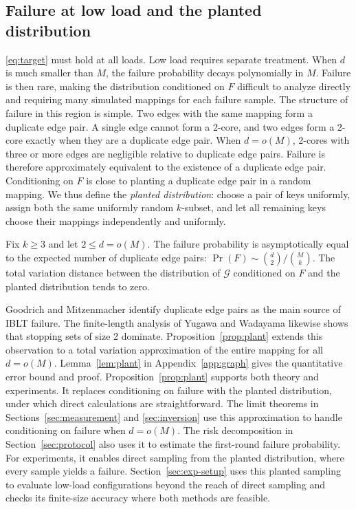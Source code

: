 \subsection{Failure at low load and the planted distribution}\label{sec:plant}
\eqref{eq:target} must hold at all loads. Low load requires separate treatment. When $d$ is much smaller than $M$, the failure probability decays polynomially in $M$. Failure is then rare, making the distribution conditioned on $F$ difficult to analyze directly and requiring many simulated mappings for each failure sample. The structure of failure in this region is simple. Two edges with the same mapping form a duplicate edge pair. A single edge cannot form a 2-core, and two edges form a 2-core exactly when they are a duplicate edge pair. When $d=o(M)$, 2-cores with three or more edges are negligible relative to duplicate edge pairs. Failure is therefore approximately equivalent to the existence of a duplicate edge pair. Conditioning on $F$ is close to planting a duplicate edge pair in a random mapping. We thus define the \emph{planted distribution}: choose a pair of keys uniformly, assign both the same uniformly random $k$-subset, and let all remaining keys choose their mappings independently and uniformly.

\begin{proposition}[Failure is determined by duplicate edge pairs when $d=o(M)$]\label{prop:plant}
Fix $k\ge3$ and let $2\le d=o(M)$. The failure probability is asymptotically equal to the expected number of duplicate edge pairs: $\Pr(F)\sim\binom d2/\binom Mk$. The total variation distance between the distribution of $\mathcal G$ conditioned on $F$ and the planted distribution tends to zero.
\end{proposition}

Goodrich and Mitzenmacher\cite{gm} identify duplicate edge pairs as the main source of IBLT failure. The finite-length analysis of Yugawa and Wadayama\cite{yw} likewise shows that stopping sets of size 2 dominate. Proposition~\ref{prop:plant} extends this observation to a total variation approximation of the entire mapping for all $d=o(M)$. Lemma~\ref{lem:plant} in Appendix~\ref{app:graph} gives the quantitative error bound and proof. Proposition~\ref{prop:plant} supports both theory and experiments. It replaces conditioning on failure with the planted distribution, under which direct calculations are straightforward. The limit theorems in Sections~\ref{sec:measurement} and \ref{sec:inversion} use this approximation to handle conditioning on failure when $d=o(M)$. The risk decomposition in Section~\ref{sec:protocol} also uses it to estimate the first-round failure probability. For experiments, it enables direct sampling from the planted distribution, where every sample yields a failure. Section~\ref{sec:exp-setup} uses this planted sampling to evaluate low-load configurations beyond the reach of direct sampling and checks its finite-size accuracy where both methods are feasible.

